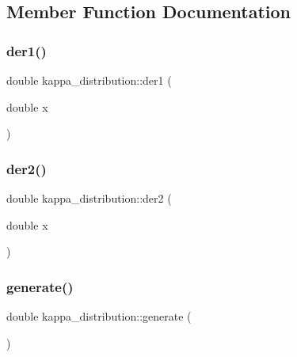 \subsection{Member Function Documentation}
\hypertarget{classkappa__distribution_ae7fee7da2f235cf8d319e00a7f8a4dc3}{}\label{classkappa__distribution_ae7fee7da2f235cf8d319e00a7f8a4dc3} 
\subsubsection{\texorpdfstring{der1()}{der1()}}
{\footnotesize\ttfamily double kappa\+\_\+distribution\+::der1 (\begin{DoxyParamCaption}\item[{double}]{x }\end{DoxyParamCaption})\hspace{0.3cm}{\ttfamily [inline]}}

\hypertarget{classkappa__distribution_aafde4b907d4e201a59e3706ef5cb7c53}{}\label{classkappa__distribution_aafde4b907d4e201a59e3706ef5cb7c53} 
\subsubsection{\texorpdfstring{der2()}{der2()}}
{\footnotesize\ttfamily double kappa\+\_\+distribution\+::der2 (\begin{DoxyParamCaption}\item[{double}]{x }\end{DoxyParamCaption})\hspace{0.3cm}{\ttfamily [inline]}}

\hypertarget{classkappa__distribution_af8f5aef5827c9423c2d9c65a53a43202}{}\label{classkappa__distribution_af8f5aef5827c9423c2d9c65a53a43202} 
\subsubsection{\texorpdfstring{generate()}{generate()}}
{\footnotesize\ttfamily double kappa\+\_\+distribution\+::generate (\begin{DoxyParamCaption}{ }\end{DoxyParamCaption})\hspace{0.3cm}{\ttfamily [inline]}}

